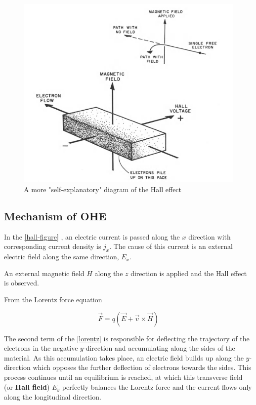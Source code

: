 \begin{figure}[h!]
    \includegraphics[width=\columnwidth]{hall-effect-hurd.png}
    \caption{A more "self-explanatory" diagram of the Hall effect}
\end{figure}

\subsection{Mechanism of OHE}

In the \cref{hall-figure} , an electric current is passed along the $ x $ direction with corresponding current density is $ j_x $. 
The cause of this current is an external electric field along the same direction, $ E_x $.

An external magnetic field $ H $ along the $ z $ direction is applied and the Hall effect is observed.

From the Lorentz force equation

\begin{equation} \label{lorentz} 
    \vec{F} = q (\vec{E} + \vec{v} \times \vec{H})
\end{equation}

The second term of the \cref{lorentz} is responsible for deflecting the trajectory of the electrons in the negative $ y $-direction and accumulating along the sides of the material. 
As this accumulation takes place, an electric field builds up along the $ y $-direction which opposes the further deflection of electrons towards the sides. 
This process continues until an equilibrium is reached, at which this transverse field (or \textbf{Hall field}) $ E_y $ perfectly balances the Lorentz force and the current flows only along the longitudinal direction.

